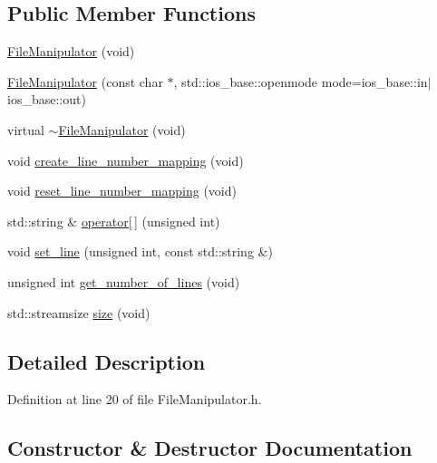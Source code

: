 \subsection*{Public Member Functions}
\begin{DoxyCompactItemize}
\item 
\hyperlink{classjayacode_1_1_file_manipulator_ae30549aec4956d3002f6716ab6eb27fb}{File\+Manipulator} (void)
\item 
\hyperlink{classjayacode_1_1_file_manipulator_ae3397a4a0fb046958476677e5083db71}{File\+Manipulator} (const char $\ast$, std\+::ios\+\_\+base\+::openmode mode=ios\+\_\+base\+::in$\vert$ios\+\_\+base\+::out)
\item 
virtual \hyperlink{classjayacode_1_1_file_manipulator_aab953ecb20bf75360917c5d66a8c95b5}{$\sim$\+File\+Manipulator} (void)
\item 
void \hyperlink{classjayacode_1_1_file_manipulator_a3f1dfa6142af1ae84dabe99a24424e42}{create\+\_\+line\+\_\+number\+\_\+mapping} (void)
\item 
void \hyperlink{classjayacode_1_1_file_manipulator_afd35deee67597d495224f31628f73050}{reset\+\_\+line\+\_\+number\+\_\+mapping} (void)
\item 
std\+::string \& \hyperlink{classjayacode_1_1_file_manipulator_a826ec04085638ec37ea29a43b895152c}{operator\mbox{[}$\,$\mbox{]}} (unsigned int)
\item 
void \hyperlink{classjayacode_1_1_file_manipulator_a6206218fbe436c7899f268f34ba73431}{set\+\_\+line} (unsigned int, const std\+::string \&)
\item 
unsigned int \hyperlink{classjayacode_1_1_file_manipulator_a9a8ca423c0ed325ff440ac5996aa0f3a}{get\+\_\+number\+\_\+of\+\_\+lines} (void)
\item 
std\+::streamsize \hyperlink{classjayacode_1_1_file_manipulator_a2844059fa5a29cf6fa4da28c898e5c50}{size} (void)
\end{DoxyCompactItemize}


\subsection{Detailed Description}


Definition at line 20 of file File\+Manipulator.\+h.



\subsection{Constructor \& Destructor Documentation}
\mbox{\label{classjayacode_1_1_file_manipulator_ae30549aec4956d3002f6716ab6eb27fb}} 
